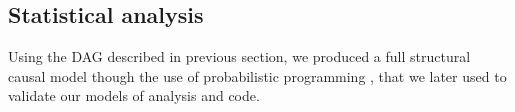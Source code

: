\subsection{Statistical analysis} \label{sS:stat_analysis}
%
Using the DAG described in previous section, we produced a full structural causal model though the use of probabilistic programming \cite{Jaynes_2003}, that we later used to validate our models of analysis and code. 
%
\begin{comment}
	for the NH group uses the child's \textit{age} (at recording), the method cannot use the same variable for the other two groups. This is due to the fact that \textit{age} is merely used as a proxy, for the amount of time a child has been developing his(her) language. In that sense, more appropriate variables to use under the HI/CI group would be e.g. the \textit{device length of use}, which approximates the ``hearing age'' of such children, or their \textit{vocabulary size}, which resembles their "lexical age" \citep{Faes_et_al_2021}. For this research, we consider the \textit{device length of use} as the simplest one to implement. 
\end{comment}
%
%

